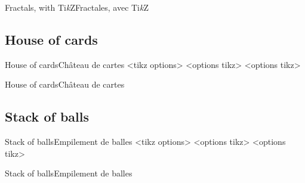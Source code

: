 \documentclass[a4paper,english,11pt]{article}
\providecommand\tikzlogo{Ti\textit{k}Z}
\let\TikZ\tikzlogo
\begin{document}
\begin{myprestex}{Fractals, with \TikZ}{Fractales, avec \TikZ}
\pfltkzfractal[type=Koch]
\pfltkzfractal[type=Sierp]
\end{myprestex}

\subsection{House of cards}

\begin{myprestexcode}{House of cards}{Château de cartes}
<tikz options>
<options tikz>
<options tikz>

\end{myprestexcode}

\begin{myprestex}{House of cards}{Château de cartes}
\end{myprestex}

\subsection{Stack of balls}

\begin{myprestexcode}{Stack of balls}{Empilement de balles}
<tikz options>
<options tikz>
<options tikz>

\end{myprestexcode}

\begin{myprestex}{Stack of balls}{Empilement de balles}
\end{myprestex}



\end{document}
